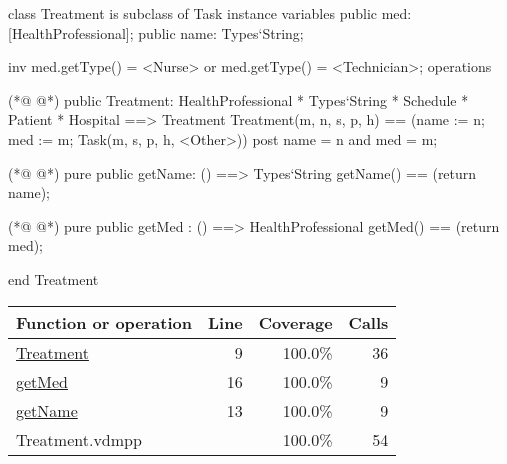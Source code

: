 \begin{vdmpp}[breaklines=true]
class Treatment is subclass of Task
instance variables
  public med: [HealthProfessional];
  public name: Types`String;
  
  inv med.getType() = <Nurse> or med.getType() = <Technician>;
operations

(*@
\label{Treatment:9}
@*)
 public Treatment: HealthProfessional * Types`String * Schedule * Patient * Hospital ==> Treatment
  Treatment(m, n, s, p, h) == (name := n; med := m; Task(m, s, p, h, <Other>))
 post name = n and med = m;
 
(*@
\label{getName:13}
@*)
 pure public getName: () ==> Types`String
  getName() == (return name);
 
(*@
\label{getMed:16}
@*)
 pure public getMed : () ==> HealthProfessional
  getMed() == (return med);

end Treatment
\end{vdmpp}
\bigskip
\begin{longtable}{|l|r|r|r|}
\hline
Function or operation & Line & Coverage & Calls \\
\hline
\hline
\hyperref[Treatment:9]{Treatment} & 9&100.0\% & 36 \\
\hline
\hyperref[getMed:16]{getMed} & 16&100.0\% & 9 \\
\hline
\hyperref[getName:13]{getName} & 13&100.0\% & 9 \\
\hline
\hline
Treatment.vdmpp & & 100.0\% & 54 \\
\hline
\end{longtable}

